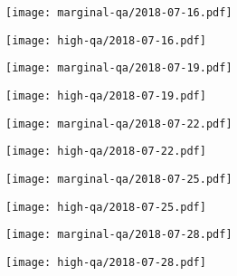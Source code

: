 \documentclass{article}
\begin{document}
\begin{figure}[H]
	\ContinuedFloat
	\centering
	\begin{subfigure}{0.48\linewidth}
		\texttt{[image: marginal-qa/2018-07-16.pdf]}
	\end{subfigure}
	\begin{subfigure}{0.48\linewidth}
		\texttt{[image: high-qa/2018-07-16.pdf]}
	\end{subfigure}
	\begin{subfigure}{0.48\linewidth}
		\texttt{[image: marginal-qa/2018-07-19.pdf]}
	\end{subfigure}
	\begin{subfigure}{0.48\linewidth}
		\texttt{[image: high-qa/2018-07-19.pdf]}
	\end{subfigure}
	\begin{subfigure}{0.48\linewidth}
		\texttt{[image: marginal-qa/2018-07-22.pdf]}
	\end{subfigure}
	\begin{subfigure}{0.48\linewidth}
		\texttt{[image: high-qa/2018-07-22.pdf]}
	\end{subfigure}
	\begin{subfigure}{0.48\linewidth}
		\texttt{[image: marginal-qa/2018-07-25.pdf]}
	\end{subfigure}
	\begin{subfigure}{0.48\linewidth}
		\texttt{[image: high-qa/2018-07-25.pdf]}
	\end{subfigure}
	\begin{subfigure}{0.48\linewidth}
		\texttt{[image: marginal-qa/2018-07-28.pdf]}
	\end{subfigure}
	\begin{subfigure}{0.48\linewidth}
		\texttt{[image: high-qa/2018-07-28.pdf]}
	\end{subfigure}
\end{figure}
\end{document}

